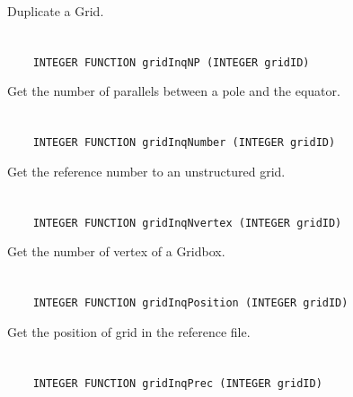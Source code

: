 Duplicate a Grid.


\section*{\tt {}}

\begin{verbatim}
    INTEGER FUNCTION gridInqNP (INTEGER gridID)
\end{verbatim}

Get the number of parallels between a pole and the equator.


\section*{\tt {}}

\begin{verbatim}
    INTEGER FUNCTION gridInqNumber (INTEGER gridID)
\end{verbatim}

Get the reference number to an unstructured grid.


\section*{\tt {}}

\begin{verbatim}
    INTEGER FUNCTION gridInqNvertex (INTEGER gridID)
\end{verbatim}

Get the number of vertex of a Gridbox.


\section*{\tt {}}

\begin{verbatim}
    INTEGER FUNCTION gridInqPosition (INTEGER gridID)
\end{verbatim}

Get the position of grid in the reference file.


\section*{\tt {}}

\begin{verbatim}
    INTEGER FUNCTION gridInqPrec (INTEGER gridID)
\end{verbatim}

